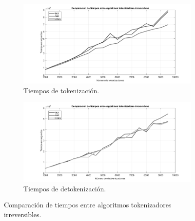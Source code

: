 \begin{figure}
  \centering
  \begin{subfigure}{1\textwidth}
    \begin{center}
      \includegraphics[width=1\linewidth]
        {../../../../../diagramas_comunes/desempenio/tok_irrev_bn}
      \caption{Tiempos de tokenización.}
    \end{center}
  \end{subfigure}
  \begin{subfigure}{0.9\textwidth}
    \begin{center}
      \includegraphics[width=1\linewidth]{diagramas/detok_irrev_bn}
      \caption{Tiempos de detokenización.}
    \end{center}
  \end{subfigure}
  \caption{Comparación de tiempos entre algoritmos tokenizadores irreversibles.}
  \label{figura:tok_irrev}
\end{figure}

